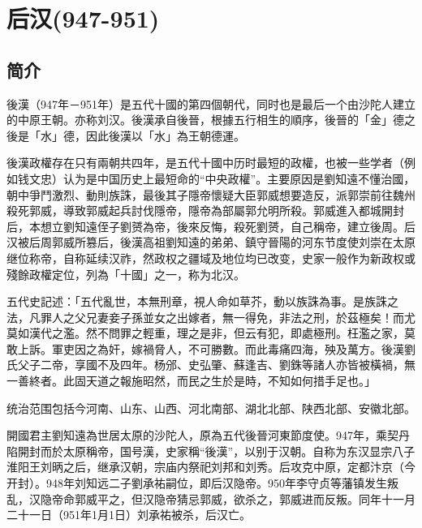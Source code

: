 

\section{后汉\tiny(947-951)}

\subsection{简介}

後漢（947年－951年）是五代十國的第四個朝代，同时也是最后一个由沙陀人建立的中原王朝。亦称刘汉。後漢承自後晉，根據五行相生的順序，後晉的「金」德之後是「水」德，因此後漢以「水」為王朝德運。

後漢政權存在只有兩朝共四年，是五代十國中历时最短的政權，也被一些学者（例如钱文忠）认为是中国历史上最短命的“中央政權”。主要原因是劉知遠不懂治國，朝中爭鬥激烈、動則族誅，最後其子隱帝懷疑大臣郭威想要造反，派郭崇前往魏州殺死郭威，導致郭威起兵討伐隱帝，隱帝為部屬郭允明所殺。郭威進入都城開封后，本想立劉知遠侄子劉赟為帝，後來反悔，殺死劉赟，自己稱帝，建立後周。后汉被后周郭威所篡后，後漢高祖劉知遠的弟弟、鎮守晉陽的河东节度使刘崇在太原继位称帝，自称延续汉祚，然政权之疆域及地位均已改变，史家一般作为新政权或殘餘政權定位，列為「十國」之一，称为北汉。

五代史記述：「五代亂世，本無刑章，視人命如草芥，動以族誅為事。是族誅之法，凡罪人之父兄妻妾子孫並女之出嫁者，無一得免，非法之刑，於茲極矣！而尤莫如漢代之濫。然不問罪之輕重，理之是非，但云有犯，即處極刑。枉濫之家，莫敢上訴。軍吏因之為奸，嫁禍脅人，不可勝數。而此毒痛四海，殃及萬方。後漢劉氏父子二帝，享國不及四年。杨邠、史弘肇、蘇逢吉、劉銖等諸人亦皆被橫禍，無一善終者。此固天道之報施昭然，而民之生於是時，不知如何措手足也。」

统治范围包括今河南、山东、山西、河北南部、湖北北部、陕西北部、安徽北部。

開國君主劉知遠為世居太原的沙陀人，原為五代後晉河東節度使。947年，乘契丹陷開封而於太原稱帝，国号漢，史家稱“後漢”，以别于汉朝。自称为东汉显宗八子淮阳王刘昞之后，继承汉朝，宗庙内祭祀刘邦和刘秀。后攻克中原，定都汴京（今开封）。948年刘知远二子劉承祐嗣位，即后汉隐帝。950年李守贞等藩镇发生叛乱，汉隐帝命郭威平之，但汉隐帝猜忌郭威，欲杀之，郭威进而反叛。同年十一月二十一日（951年1月1日）刘承祐被杀，后汉亡。





